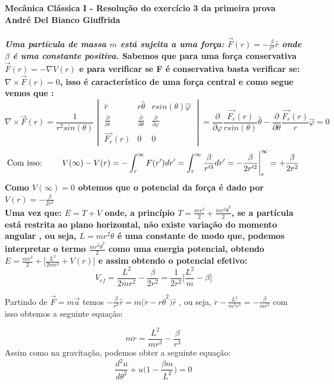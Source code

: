\documentclass[a4paper,12pt]{exam}
\begin{document}
	\begingroup 
	  \bf Mecânica Clássica I - Resolução do exercício 3 da primeira prova\\
	  \indent André Del Bianco Giuffrida
	\endgroup
	\\ 
	\\ 
	\indent \textit{ Uma partícula de massa $m$ está sujeita a uma força:}
		$ \vec{F}(r)= -\frac{\beta}{r^3}\hat{r} $ \textit{ onde $\beta$ é uma constante positiva.}
		\indent Sabemos que para uma força conservativa $\vec{F}(r)= - \nabla V(r)$ e para verificar se F é conservativa basta verificar se: $\nabla \times \vec{F}(r) = 0$, isso é característico de uma força central e como segue vemos que :
		\[ \nabla \times \vec{F}(r) = \frac{1}{r^2 sin(\theta)}
			\begin{vmatrix}
				\hat{r} & r \hat{\theta} & rsin(\theta)\hat{\varphi} \\
				\frac{\partial}{\partial r} & \frac{\partial}{\partial \theta} & \frac{\partial}{\partial \varphi} \\
				\vec{F_r}(r) & 0 & 0 
			\end{vmatrix}
		= \frac{\partial}{\partial \varphi} \frac{\vec{F_r}(r)}{r sin(\theta)}\hat{\theta} -  \frac{\partial}{\partial \theta} \frac{\vec{F_r}(r)}{r} \hat{\varphi} = 0
		\] 
		\[ \text{Com isso: \quad \quad} V(\infty) - V(r) = - \int_{r}^{\infty} F(r')dr' = \int_{r}^{\infty} \frac{\beta}{r'^3} dr' = -\frac{\beta}{2r'^2} \Bigg|_{r}^{\infty} = +\frac{\beta}{2r^2}\]
		Como $V(\infty) = 0$ obtemos que o potencial da força é dado por $ V(r) = -\frac{\beta}{2r^2} $
		\\
		Uma vez que: $E = T + V$ onde, a princípio $T = \frac{mv^2}{2} + \frac{mr^2\dot\theta^2}{2}$, se a partícula está restrita ao plano horizontal, não existe variação do momento angular , ou seja, $L = m r^2 \dot\theta$ é uma constante de modo que, podemos interpretar o termo $\frac{mr^2\dot\theta^2}{2}$ como uma energia potencial, obtendo $E = \frac{mv^2}{2} + \big[\frac{ L^2 }{2mr^2} + V(r) \big]$ e assim obtendo o potencial efetivo:
		\[ V_{ef} = \frac{ L^2 }{2mr^2} - \frac{\beta}{2r^2}  = \frac{1}{2r^2} \Bigg[\frac{L^2}{m} - \beta \Bigg] \]
		
		Partindo de $\vec{F} = m\vec{a}$ temos $-\frac{\beta}{r^3}\hat{r} = m \big(\ddot{r} - r\dot{\theta}^2 \big)\hat{r} $ , ou seja, $ \ddot{r} - \frac{L^2}{m^2 r^3} = -\frac{\beta}{mr^3}$ com isso obtemos a seguinte equação:
		
		\[ m\ddot{r} = \frac{L^2}{mr^3} - \frac{\beta}{r^3} \]
		Assim como na gravitação, podemos obter a seguinte equação:		
		\[ \frac{d^2u}{d\theta^2} + u \Big( 1- \frac{\beta m}{L^2} \Big) = 0 \]
		
\end{document}
